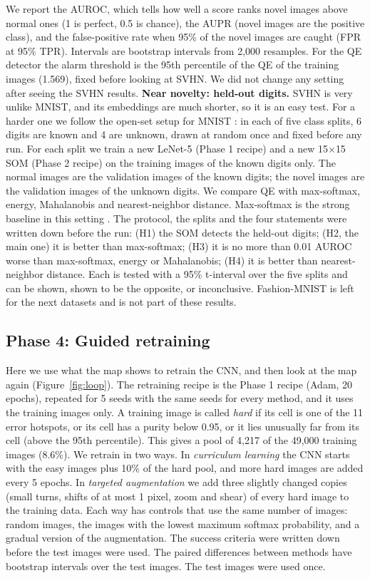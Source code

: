 \documentclass[11pt]{article}
\begin{document}
We report the AUROC, which tells how well a score ranks novel images above normal ones (1 is perfect, 0.5 is chance), the AUPR (novel images are the positive class), and the false-positive rate when 95\% of the novel images are caught (FPR at 95\% TPR). Intervals are bootstrap intervals from 2,000 resamples.
For the QE detector the alarm threshold is the 95th percentile of the QE of the training images (1.569), fixed before looking at SVHN. We did not change any setting after seeing the SVHN results.
\textbf{Near novelty: held-out digits.} SVHN is very unlike MNIST, and its embeddings are much shorter, so it is an easy test. For a harder one we follow the open-set setup for MNIST \parencite{neal2018open}: in each of five class splits, 6 digits are known and 4 are unknown, drawn at random once and fixed before any run. For each split we train a new LeNet-5 (Phase 1 recipe) and a new 15$\times$15 SOM (Phase 2 recipe) on the training images of the known digits only. The normal images are the validation images of the known digits; the novel images are the validation images of the unknown digits. We compare QE with max-softmax, energy, Mahalanobis and nearest-neighbor distance. Max-softmax is the strong baseline in this setting \parencite{vaze2022openset}. The protocol, the splits and the four statements were written down before the run: (H1) the SOM detects the held-out digits; (H2, the main one) it is better than max-softmax; (H3) it is no more than 0.01 AUROC worse than max-softmax, energy or Mahalanobis; (H4) it is better than nearest-neighbor distance. Each is tested with a 95\% t-interval over the five splits and can be shown, shown to be the opposite, or inconclusive.
Fashion-MNIST is left for the next datasets and is not part of these results.

\subsection{Phase 4: Guided retraining}

Here we use what the map shows to retrain the CNN, and then look at the map again (Figure~\ref{fig:loop}). The retraining recipe is the Phase 1 recipe (Adam, 20 epochs), repeated for 5 seeds with the same seeds for every method, and it uses the training images only.
A training image is called \emph{hard} if its cell is one of the 11 error hotspots, or its cell has a purity below 0.95, or it lies unusually far from its cell (above the 95th percentile). This gives a pool of 4,217 of the 49,000 training images (8.6\%).
We retrain in two ways. In \emph{curriculum learning} the CNN starts with the easy images plus 10\% of the hard pool, and more hard images are added every 5 epochs. In \emph{targeted augmentation} we add three slightly changed copies (small turns, shifts of at most 1 pixel, zoom and shear) of every hard image to the training data.
Each way has controls that use the same number of images: random images, the images with the lowest maximum softmax probability, and a gradual version of the augmentation. The success criteria were written down before the test images were used. The paired differences between methods have bootstrap intervals over the test images.
The test images were used once.
\end{document}
